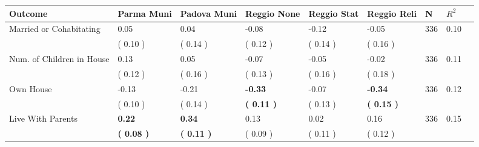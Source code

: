 \begin{tabular}{L{6.2cm} C{1.8cm} C{1.8cm} C{1.8cm} C{1.8cm} C{1.8cm} C{1.8cm} C{0.3cm} C{0.3cm}}
\toprule
 \textbf{Outcome} & \textbf{Parma Muni} & \textbf{Padova Muni} & \textbf{Reggio None} & \textbf{Reggio Stat} & \textbf{Reggio Reli} & \textbf{N} & \textbf{$ R^2$} \\
\midrule
Married or Cohabitating &      0.05 &      0.04 &     -0.08 &     -0.12 &     -0.05  & 336 &       0.10 \\ 
 & (     0.10 ) & (     0.14 ) & (     0.12 ) & (     0.14 ) & (     0.16 )  & \\
Num. of Children in House &      0.13 &      0.05 &     -0.07 &     -0.05 &     -0.02  & 336 &       0.11 \\ 
 & (     0.12 ) & (     0.16 ) & (     0.13 ) & (     0.16 ) & (     0.18 )  & \\
Own House &     -0.13 &     -0.21 & \textbf{    -0.33} &     -0.07 & \textbf{    -0.34}  & 336 &       0.12 \\ 
 & (     0.10 ) & (     0.14 ) & \textbf{(     0.11 )} & (     0.13 ) & \textbf{(     0.15 )}  & \\
Live With Parents & \textbf{     0.22} & \textbf{     0.34} &      0.13 &      0.02 &      0.16  & 336 &       0.15 \\ 
 & \textbf{(     0.08 )} & \textbf{(     0.11 )} & (     0.09 ) & (     0.11 ) & (     0.12 )  & \\
\bottomrule
\end{tabular}
